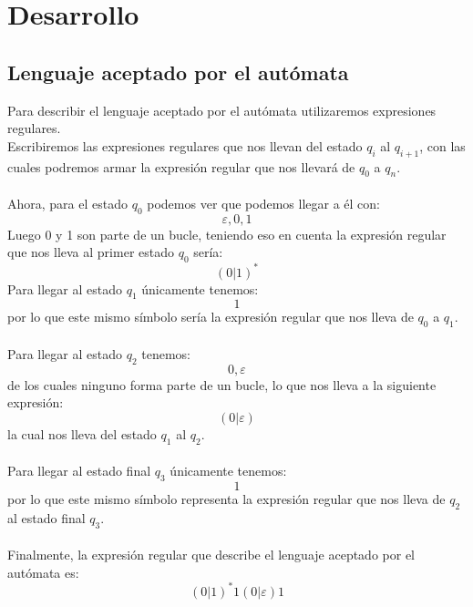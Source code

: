 \documentclass[spanish]{article}
\begin{document}
\section{Desarrollo}
	\subsection{Lenguaje aceptado por el autómata}
    	Para describir el lenguaje aceptado por el autómata utilizaremos expresiones regulares.\\Escribiremos las expresiones regulares que nos llevan del estado $q_{i}$ al $q_{i+1}$, con las cuales podremos armar la expresión regular que nos llevará de $q_0$ a $q_n$.\\\\
        Ahora, para el estado $q_0$ podemos ver que podemos llegar a él con:
        $$\varepsilon, 0, 1$$
        Luego 0 y 1 son parte de un bucle, teniendo eso en cuenta la expresión regular que nos lleva al primer estado $q_0$ sería:
        $$(0|1)^*$$
       	Para llegar al estado $q_1$ únicamente tenemos:
        $$1$$
        por lo que este mismo símbolo sería la expresión regular que nos lleva de $q_0$ a $q_1$.\\\\
        Para llegar al estado $q_2$ tenemos:
        $$0, \varepsilon$$
        de los cuales ninguno forma parte de un bucle, lo que nos lleva a la siguiente expresión:
        $$(0|\varepsilon)$$
        la cual nos lleva del estado $q_1$ al $q_2$.\\\\
        Para llegar al estado final $q_3$ únicamente tenemos:
        $$1$$
        por lo que este mismo símbolo representa la expresión regular que nos lleva de $q_2$ al estado final $q_3$.\\\\
        Finalmente, la expresión regular que describe el lenguaje aceptado por el autómata es:
        $$(0|1)^*1(0|\varepsilon)1$$
        
\end{document}
